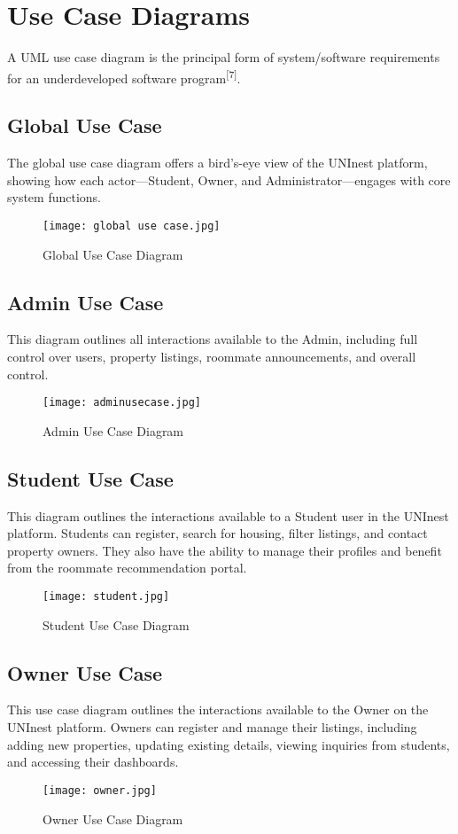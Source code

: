 \section{Use Case Diagrams}
A UML use case diagram is the principal form of system/software requirements for an underdeveloped software program\textsuperscript{[7]}.

\subsection{Global Use Case}
The global use case diagram offers a bird's-eye view of the UNInest platform, showing how each actor—Student, Owner, and Administrator—engages with core system functions.

\begin{figure}[H]
    \centering
    \texttt{[image: global use case.jpg]}
    \caption{Global Use Case Diagram}
    \label{fig:global_use_case}
\end{figure}

\subsection{Admin Use Case}
This diagram outlines all interactions available to the Admin, including full control over users, property listings, roommate announcements, and overall control.

\begin{figure}[H]
    \centering
    \texttt{[image: adminusecase.jpg]}
    \caption{Admin Use Case Diagram}
    \label{fig:admin_use_case}
\end{figure}

\subsection{Student Use Case}
This diagram outlines the interactions available to a Student user in the UNInest platform. Students can register, search for housing, filter listings, and contact property owners. They also have the ability to manage their profiles and benefit from the roommate recommendation portal.

\begin{figure}[H]
    \centering
    \texttt{[image: student.jpg]}
    \caption{Student Use Case Diagram}
    \label{fig:student_use_case}
\end{figure}

\subsection{Owner Use Case}
This use case diagram outlines the interactions available to the Owner on the UNInest platform. Owners can register and manage their listings, including adding new properties, updating existing details, viewing inquiries from students, and accessing their dashboards.

\begin{figure}[H]
    \centering
    \texttt{[image: owner.jpg]}
    \caption{Owner Use Case Diagram}
    \label{fig:owner_use_case}
\end{figure} 